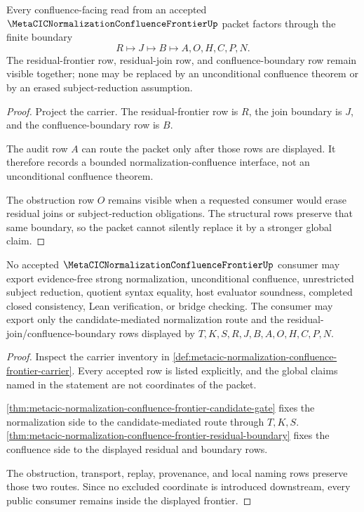 \begin{theorem}
\label{thm:metacic-normalization-confluence-frontier-residual-boundary}
Every confluence-facing read from an accepted $\MetaCICNormalizationConfluenceFrontierUp$ packet factors through the finite boundary
$$
R \longmapsto J \longmapsto B \longmapsto A,O,H,C,P,N .
$$
The residual-frontier row, residual-join row, and confluence-boundary row remain visible together; none may be replaced by an unconditional confluence theorem or by an erased subject-reduction assumption.
\end{theorem}
\begin{proof}
Project the carrier. The residual-frontier row is $R$, the join boundary is $J$, and the confluence-boundary row is $B$.

The audit row $A$ can route the packet only after those rows are displayed. It therefore records a bounded normalization-confluence interface, not an unconditional confluence theorem.

The obstruction row $O$ remains visible when a requested consumer would erase residual joins or subject-reduction obligations. The structural rows preserve that same boundary, so the packet cannot silently replace it by a stronger global claim.
\end{proof}

\begin{theorem}
\label{thm:metacic-normalization-confluence-frontier-nonescape}
No accepted $\MetaCICNormalizationConfluenceFrontierUp$ consumer may export evidence-free strong normalization, unconditional confluence, unrestricted subject reduction, quotient syntax equality, host evaluator soundness, completed closed consistency, Lean verification, or bridge checking. The consumer may export only the candidate-mediated normalization route and the residual-join/confluence-boundary rows displayed by $T,K,S,R,J,B,A,O,H,C,P,N$.
\end{theorem}
\begin{proof}
Inspect the carrier inventory in \autoref{def:metacic-normalization-confluence-frontier-carrier}. Every accepted row is listed explicitly, and the global claims named in the statement are not coordinates of the packet.

\autoref{thm:metacic-normalization-confluence-frontier-candidate-gate} fixes the normalization side to the candidate-mediated route through $T,K,S$. \autoref{thm:metacic-normalization-confluence-frontier-residual-boundary} fixes the confluence side to the displayed residual and boundary rows.

The obstruction, transport, replay, provenance, and local naming rows preserve those two routes. Since no excluded coordinate is introduced downstream, every public consumer remains inside the displayed frontier.
\end{proof}

